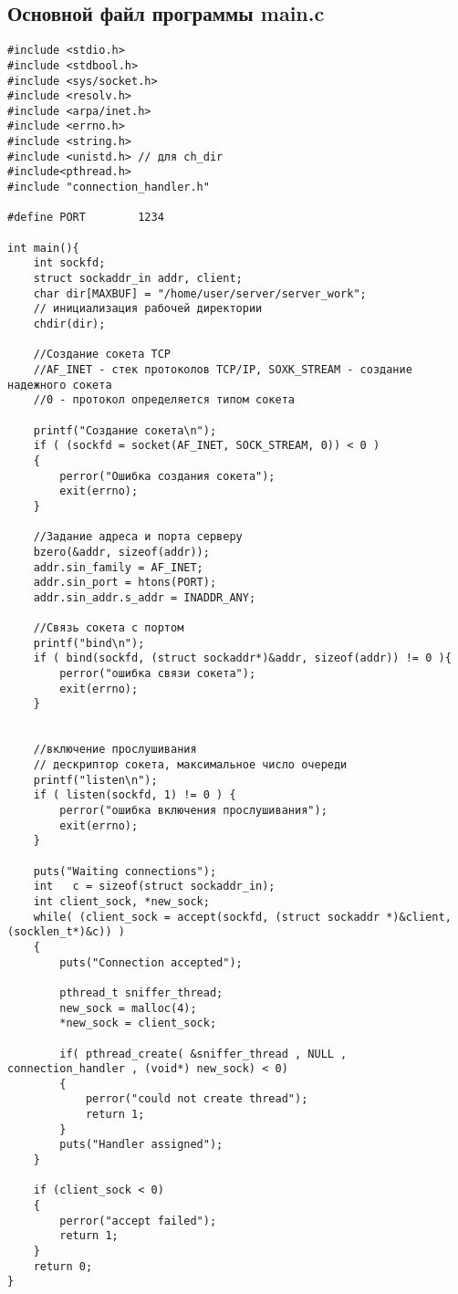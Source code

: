 \documentclass[12pt,a4paper]{report}
\begin{document}
\subsection*{Основной файл программы main.c}
\begin{lstlisting}
#include <stdio.h>
#include <stdbool.h>
#include <sys/socket.h>
#include <resolv.h>
#include <arpa/inet.h>
#include <errno.h>
#include <string.h>
#include <unistd.h> // для ch_dir
#include<pthread.h>
#include "connection_handler.h"

#define PORT        1234

int main(){
    int sockfd;
    struct sockaddr_in addr, client;
    char dir[MAXBUF] = "/home/user/server/server_work";
    // инициализация рабочей директории
    chdir(dir);

    //Создание сокета TCP
    //AF_INET - стек протоколов TCP/IP, SOXK_STREAM - создание надежного сокета
    //0 - протокол определяется типом сокета

    printf("Создание сокета\n");
    if ( (sockfd = socket(AF_INET, SOCK_STREAM, 0)) < 0 )
    {
        perror("Ошибка создания сокета");
        exit(errno);
    }

    //Задание адреса и порта серверу
    bzero(&addr, sizeof(addr));
    addr.sin_family = AF_INET;
    addr.sin_port = htons(PORT);
    addr.sin_addr.s_addr = INADDR_ANY;

    //Связь сокета с портом
    printf("bind\n");
    if ( bind(sockfd, (struct sockaddr*)&addr, sizeof(addr)) != 0 ){
        perror("ошибка связи сокета");
        exit(errno);
    }


    //включение прослушивания
    // дескриптор сокета, максимальное число очереди
    printf("listen\n");
    if ( listen(sockfd, 1) != 0 ) {
        perror("ошибка включения прослушивания");
        exit(errno);
    }

    puts("Waiting connections");
    int   c = sizeof(struct sockaddr_in);
    int client_sock, *new_sock;
    while( (client_sock = accept(sockfd, (struct sockaddr *)&client, (socklen_t*)&c)) )
    {
        puts("Connection accepted");

        pthread_t sniffer_thread;
        new_sock = malloc(4);
        *new_sock = client_sock;

        if( pthread_create( &sniffer_thread , NULL ,  connection_handler , (void*) new_sock) < 0)
        {
            perror("could not create thread");
            return 1;
        }
        puts("Handler assigned");
    }

    if (client_sock < 0)
    {
        perror("accept failed");
        return 1;
    }
    return 0;
}
\end{lstlisting}
\end{document}

